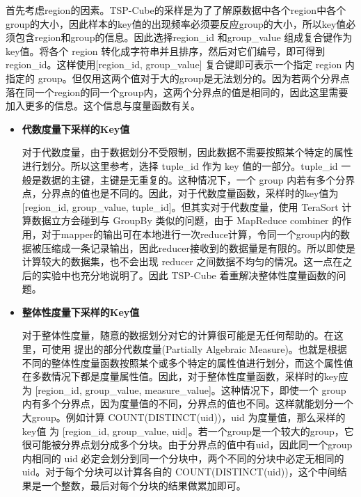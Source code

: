 首先考虑region的因素。TSP-Cube的采样是为了了解原数据中各个region中各个group的大小，因此样本的key值的出现频率必须要反应group的大小，所以key值必须包含region和group的信息。因此选择region\_id 和group\_value 组成复合键作为key值。将各个 region 转化成字符串并且排序，然后对它们编号，即可得到 region\_id。这样使用[region\_id, group\_value] 复合键即可表示一个指定 region 内指定的 group。但仅用这两个值对于大的group是无法划分的。因为若两个分界点落在同一个region的同一个group内，这两个分界点的值是相同的，因此这里需要加入更多的信息。这个信息与度量函数有关。

\begin{itemize}

\item \textbf{代数度量下采样的Key值}

对于代数度量，由于数据划分不受限制，因此数据不需要按照某个特定的属性进行划分。所以这里参考\cite{tao2013minimal}，选择 tuple\_id 作为 key 值的一部分。tuple\_id 一般是数据的主键，主键是无重复的。这种情况下，一个 group 内若有多个分界点，分界点的值也是不同的。因此，对于代数度量函数，采样时的key值为 [region\_id, group\_value, tuple\_id]。但其实对于代数度量，使用 TeraSort 计算数据立方会碰到与 GroupBy 类似的问题，由于 MapReduce combiner 的作用，对于mapper的输出可在本地进行一次reduce计算，令同一个group内的数据被压缩成一条记录输出，因此reducer接收到的数据量是有限的。所以即使是计算较大的数据集，也不会出现 reducer 之间数据不均匀的情况。这一点在之后的实验中也充分地说明了。因此 TSP-Cube 着重解决整体性度量函数的问题。

\item \textbf{整体性度量下采样的Key值}

对于整体性度量，随意的数据划分对它的计算很可能是无任何帮助的。在这里，可使用 \cite{nandi2011distributed} 提出的部分代数度量(Partially Algebraic Measure)。也就是根据不同的整体性度量函数按照某个或多个特定的属性值进行划分，而这个属性值在多数情况下都是度量属性值。因此，对于整体性度量函数，采样时的key应为 [region\_id, group\_value, measure\_value]。这种情况下，即使一个 group 内有多个分界点，因为度量值的不同，分界点的值也不同。这样就能划分一个大group。例如计算 COUNT(DISTINCT(uid))，uid 为度量值，那么采样的key值	为 [region\_id, group\_value, uid]。若一个group是一个较大的group，它很可能被分界点划分成多个分块。由于分界点的值中有uid，因此同一个group内相同的 uid 必定会划分到同一个分块中，两个不同的分块中必定无相同的 uid。对于每个分块可以计算各自的 COUNT(DISTINCT(uid))，这个中间结果是一个整数，最后对每个分块的结果做累加即可。

\end{itemize}

